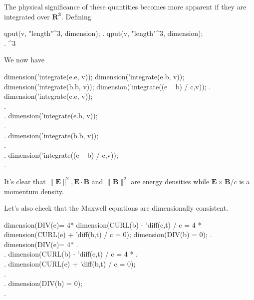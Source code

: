 \noindent The physical significance of these quantities becomes more apparent if they are integrated over $\mathbf{R^3}$.  Defining

\beginmaximasession
qput(v, "length"^3, dimension);
\maximatexsession
{}.  qput(v, "length"^3, dimension); \\
.  ^{3} \\
\endmaximasession

\noindent We now have

\beginmaximasession
dimension('integrate(e.e, v));
dimension('integrate(e.b, v));
dimension('integrate(b.b, v));
dimension('integrate((e ~ b) / c,v));
\maximatexsession
{}.  dimension('integrate(e.e, v)); \\
.   \\
.  dimension('integrate(e.b, v)); \\
.   \\
.  dimension('integrate(b.b, v)); \\
.   \\
.  dimension('integrate((e ~ b) / c,v)); \\
.   \\
\endmaximasession

\noindent It's clear that $\| \mathbf{E} \|^2, \mathbf{E} \cdot \mathbf{B}$
and $\| \mathbf{B} \|^2$ are energy densities while
$\mathbf{E} \times \mathbf{B} / c$ is a momentum density.

Let's also check that the Maxwell equations are
dimensionally consistent.

\beginmaximasession
dimension(DIV(e)= 4*%
dimension(CURL(b) - 'diff(e,t) / c = 4 * %
dimension(CURL(e) + 'diff(b,t) / c = 0);
dimension(DIV(b) = 0);
\maximatexsession
{}.  dimension(DIV(e)= 4*%
.   \\
.  dimension(CURL(b) - 'diff(e,t) / c = 4 * %
.   \\
.  dimension(CURL(e) + 'diff(b,t) / c = 0); \\
.   \\
.  dimension(DIV(b) = 0); \\
.   \\
\endmaximasession
